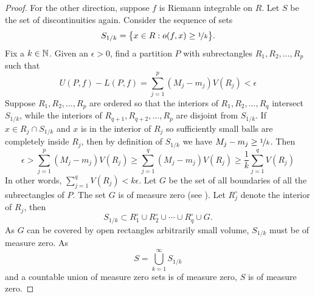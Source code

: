 \begin{proof}
For the other direction, suppose $f$ is Riemann integrable
on $R$.
Let $S$ be the set of discontinuities again.  Consider
the sequence of sets
\begin{equation*}
S_{1/k} = \bigl\{ x \in R : o(f,x) \geq \nicefrac{1}{k} \bigr\}.
\end{equation*}
Fix a $k \in {\mathbb{N}}$.
Given an $\epsilon > 0$, find a partition $P$ with subrectangles
$R_1,R_2,\ldots,R_p$ such that
\begin{equation*}
U(P,f)-L(P,f) =
\sum_{j=1}^p (M_j-m_j) V(R_j)
< \epsilon
\end{equation*}
Suppose $R_1,R_2,\ldots,R_p$ are ordered so that
the interiors of $R_1,R_2,\ldots,R_{q}$ intersect $S_{1/k}$,
while the interiors of $R_{q+1},R_{q+2},\ldots,R_p$
are disjoint from $S_{1/k}$.  If $x \in R_j \cap S_{1/k}$
and $x$ is in the interior of $R_j$ so
sufficiently small balls are completely inside $R_j$,
then by definition of $S_{1/k}$ we have
$M_j-m_j \geq \nicefrac{1}{k}$.
Then
\begin{equation*}
\epsilon >
\sum_{j=1}^p (M_j-m_j) V(R_j)
\geq
\sum_{j=1}^q (M_j-m_j) V(R_j)
\geq
\frac{1}{k}
\sum_{j=1}^q V(R_j)
\end{equation*}
In other words,
$\sum_{j=1}^q V(R_j) < k \epsilon$.
Let $G$ be the set of all boundaries of all the subrectangles
of $P$.  The set $G$ is of measure zero (see ).
Let $R_j^\circ$ denote the interior of $R_j$, then
\begin{equation*}
S_{1/k} \subset R_1^\circ \cup R_2^\circ \cup \cdots \cup R_q^\circ \cup G .
\end{equation*}
As $G$ can be covered by open rectangles arbitrarily small volume,
$S_{1/k}$ must be of measure zero.  As
\begin{equation*}
S = \bigcup_{k=1}^\infty S_{1/k}
\end{equation*}
and a countable union of measure zero sets is of measure zero, 
$S$ is of measure zero.
\end{proof}

